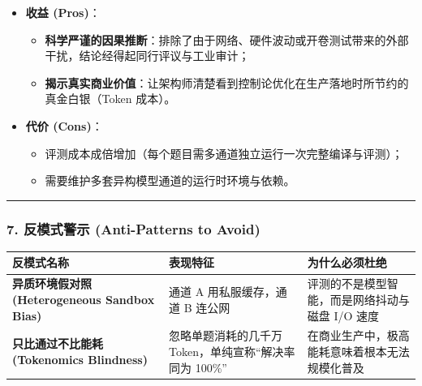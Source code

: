 \begin{itemize}
\tightlist
\item
  \textbf{收益 (Pros)}：

  \begin{itemize}
  \tightlist
  \item
    \textbf{科学严谨的因果推断}：排除了由于网络、硬件波动或开卷测试带来的外部干扰，结论经得起同行评议与工业审计；
  \item
    \textbf{揭示真实商业价值}：让架构师清楚看到控制论优化在生产落地时所节约的真金白银（Token
    成本）。
  \end{itemize}
\item
  \textbf{代价 (Cons)}：

  \begin{itemize}
  \tightlist
  \item
    评测成本成倍增加（每个题目需多通道独立运行一次完整编译与评测）；
  \item
    需要维护多套异构模型通道的运行时环境与依赖。
  \end{itemize}
\end{itemize}

\begin{center}\rule{0.5\linewidth}{0.5pt}\end{center}

\subsubsection{7. 反模式警示 (Anti-Patterns to
Avoid)}\label{ux53cdux6a21ux5f0fux8b66ux793a-anti-patterns-to-avoid-19}

{\def\LTcaptype{} %
\begin{longtable}[]{@{}
  >{\raggedright\arraybackslash}p{}
  >{\raggedright\arraybackslash}p{}
  >{\raggedright\arraybackslash}p{}@{}}
\toprule\noalign{}
\begin{minipage}[b]{\linewidth}\raggedright
反模式名称
\end{minipage} & \begin{minipage}[b]{\linewidth}\raggedright
表现特征
\end{minipage} & \begin{minipage}[b]{\linewidth}\raggedright
为什么必须杜绝
\end{minipage} \\
\midrule\noalign{}
\endhead
\bottomrule\noalign{}
\endlastfoot
\textbf{异质环境假对照 (Heterogeneous Sandbox Bias)} & 通道 A
用私服缓存，通道 B 连公网 & 评测的不是模型智能，而是网络抖动与磁盘 I/O
速度 \\
\textbf{只比通过不比能耗 (Tokenomics Blindness)} & 忽略单题消耗的几千万
Token，单纯宣称``解决率同为 100\%'' &
在商业生产中，极高能耗意味着根本无法规模化普及 \\
\end{longtable}
}

